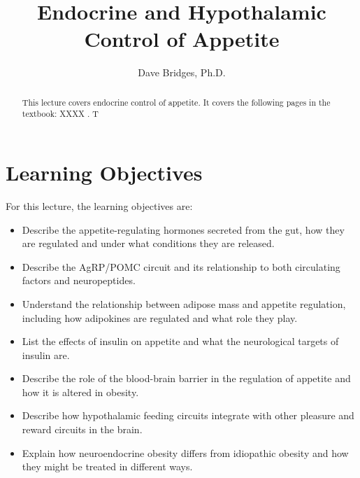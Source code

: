 \documentclass{tufte-handout}
\title{Endocrine and Hypothalamic Control of Appetite}
\author{Dave Bridges, Ph.D.}
\begin{document}
\maketitle%

\begin{abstract}
\noindent This lecture covers endocrine control of appetite.  It covers the following pages in the textbook: XXXX \cite{Widmaier2013}.  T
\end{abstract}

\tableofcontents

\pagebreak

\section{Learning Objectives}
For this lecture, the learning objectives are:
\begin{itemize}
\item Describe the appetite-regulating hormones secreted from the gut, how they are regulated and under what conditions they are released.
\item Describe the AgRP/POMC circuit and its relationship to both circulating factors and neuropeptides.
\item Understand the relationship between adipose mass and appetite regulation, including how adipokines are regulated and what role they play.
\item List the effects of insulin on appetite and what the neurological targets of insulin are.
\item Describe the role of the blood-brain barrier in the regulation of appetite and how it is altered in obesity.
\item Describe how hypothalamic feeding circuits integrate with other pleasure and reward circuits in the brain.
\item Explain how neuroendocrine obesity differs from idiopathic obesity and how they might be treated in different ways.

\end{itemize}



\listoffigures
\listoftables



\end{document}
